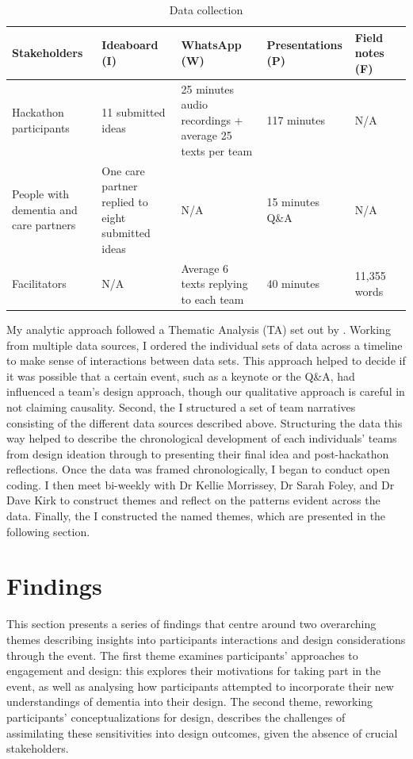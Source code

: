\begin{table}[ht]
\caption{}
\label{table:data collection}
\begin{tabularx}{\textwidth}{@{} Y|YYYYY @{}}
\textbf{Stakeholders} & \textbf{Ideaboard (I)} & \textbf{WhatsApp (W)} & \textbf{Presentations (P)} & \textbf{Field notes (F)} \\ \hline
Hackathon participants & 11 submitted ideas & 25 minutes audio recordings + average 25 texts per team & 117 minutes & N/A \\
People with dementia and care partners & One care partner replied to eight submitted ideas & N/A & 15 minutes Q\&A & N/A \\
Facilitators & N/A & Average 6 texts replying to each team & 40 minutes & 11,355 words \\
\end{tabularx}
\caption{Data collection}
\end{table}
My analytic approach followed a Thematic Analysis (TA) set out by \cite{braun_one_2020,braun_using_2006}. Working from multiple data sources, I ordered the individual sets of data across a timeline to make sense of interactions between data sets. This approach helped to decide if it was possible that a certain event, such as a keynote or the Q\&A, had influenced a team's design approach, though our qualitative approach is careful in not claiming causality. Second, the I structured a set of team narratives consisting of the different data sources described above. Structuring the data this way helped to describe the chronological development of each individuals’ teams from design ideation through to presenting their final idea and post-hackathon reflections.  Once the data was framed chronologically, I began to conduct open coding. I then meet bi-weekly with Dr Kellie Morrissey, Dr Sarah Foley, and Dr Dave Kirk to construct themes and reflect on the patterns evident across the data. Finally, the I constructed the named themes, which are presented in the following section. 

\section{Findings}
\label{sec:Findings}
This section presents a series of findings that centre around two overarching themes describing insights into participants interactions and design considerations through the event. The first theme examines participants' approaches to engagement and design: this explores their motivations for taking part in the event, as well as analysing how participants attempted to incorporate their new understandings of dementia into their design. The second theme, reworking participants’ conceptualizations for design, describes the challenges of assimilating these sensitivities into design outcomes, given the absence of crucial stakeholders.

